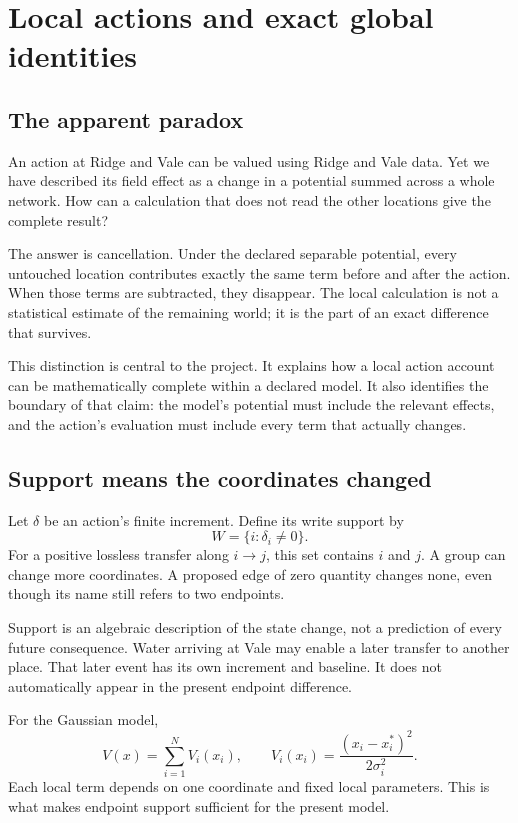 \chapter{Local actions and exact global identities}\label{ch:locality}

\section{The apparent paradox}
An action at Ridge and Vale can be valued using Ridge and Vale data. Yet we have described its field effect as a change in a potential summed across a whole network. How can a calculation that does not read the other locations give the complete result?

The answer is cancellation. Under the declared separable potential, every untouched location contributes exactly the same term before and after the action. When those terms are subtracted, they disappear. The local calculation is not a statistical estimate of the remaining world; it is the part of an exact difference that survives.

This distinction is central to the project. It explains how a local action account can be mathematically complete within a declared model. It also identifies the boundary of that claim: the model's potential must include the relevant effects, and the action's evaluation must include every term that actually changes.

\section{Support means the coordinates changed}
Let $\delta$ be an action's finite increment. Define its write support by
\begin{equation}
 W=\{i:\delta_i\ne0\}.
\end{equation}
For a positive lossless transfer along $i\to j$, this set contains $i$ and $j$. A group can change more coordinates. A proposed edge of zero quantity changes none, even though its name still refers to two endpoints.

Support is an algebraic description of the state change, not a prediction of every future consequence. Water arriving at Vale may enable a later transfer to another place. That later event has its own increment and baseline. It does not automatically appear in the present endpoint difference.

For the Gaussian model,
\[
 V(x)=\sum_{i=1}^{N}V_i(x_i),\qquad
 V_i(x_i)=\frac{(x_i-x_i^*)^2}{2\sigma_i^2}.
\]
Each local term depends on one coordinate and fixed local parameters. This is what makes endpoint support sufficient for the present model.

